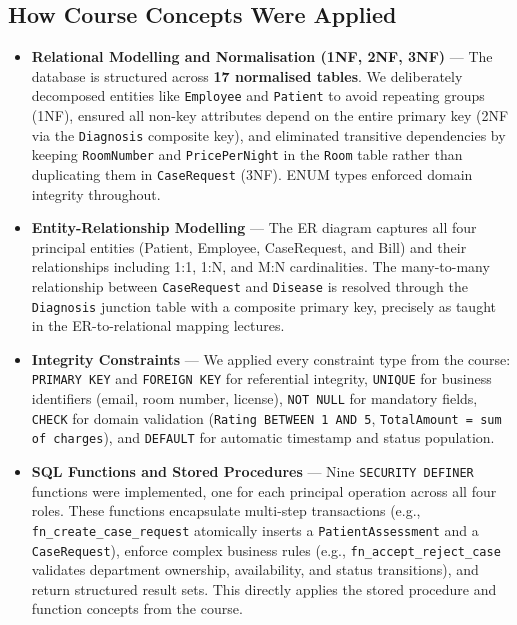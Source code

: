 \documentclass{article}
\begin{document}
\subsection{How Course Concepts Were Applied}

\begin{itemize}[leftmargin=1.5cm]

  \item \textbf{Relational Modelling and Normalisation (1NF, 2NF, 3NF)} ---
  The database is structured across \textbf{17 normalised tables}. We deliberately decomposed entities like \texttt{Employee} and \texttt{Patient} to avoid repeating groups (1NF), ensured all non-key attributes depend on the entire primary key (2NF via the \texttt{Diagnosis} composite key), and eliminated transitive dependencies by keeping \texttt{RoomNumber} and \texttt{PricePerNight} in the \texttt{Room} table rather than duplicating them in \texttt{CaseRequest} (3NF). ENUM types enforced domain integrity throughout.

  \item \textbf{Entity-Relationship Modelling} ---
  The ER diagram captures all four principal entities (Patient, Employee, CaseRequest, and Bill) and their relationships including 1:1, 1:N, and M:N cardinalities. The many-to-many relationship between \texttt{CaseRequest} and \texttt{Disease} is resolved through the \texttt{Diagnosis} junction table with a composite primary key, precisely as taught in the ER-to-relational mapping lectures.

  \item \textbf{Integrity Constraints} ---
  We applied every constraint type from the course: \texttt{PRIMARY KEY} and \texttt{FOREIGN KEY} for referential integrity, \texttt{UNIQUE} for business identifiers (email, room number, license), \texttt{NOT NULL} for mandatory fields, \texttt{CHECK} for domain validation (\texttt{Rating BETWEEN 1 AND 5}, \texttt{TotalAmount = sum of charges}), and \texttt{DEFAULT} for automatic timestamp and status population.

  \item \textbf{SQL Functions and Stored Procedures} ---
  Nine \texttt{SECURITY DEFINER} functions were implemented, one for each principal operation across all four roles. These functions encapsulate multi-step transactions (e.g., \texttt{fn\_create\_case\_request} atomically inserts a \texttt{PatientAssessment} and a \texttt{CaseRequest}), enforce complex business rules (e.g., \texttt{fn\_accept\_reject\_case} validates department ownership, availability, and status transitions), and return structured result sets. This directly applies the stored procedure and function concepts from the course.


\end{itemize}
\end{document}
